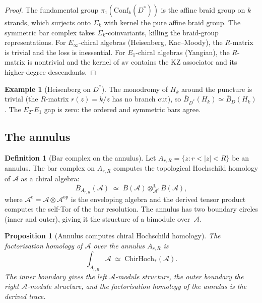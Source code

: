 \documentclass[11pt,reqno]{amsart}
\newtheorem{proposition}[theorem]{Proposition}
\theoremstyle{definition}
\newtheorem{definition}[theorem]{Definition}
\newtheorem{example}[theorem]{Example}
\theoremstyle{remark}
\providecommand{\cA}{\mathcal{A}}
\providecommand{\Conf}{\mathrm{Conf}}
\providecommand{\Eone}{E_1}
\providecommand{\Etwo}{E_2}
\providecommand{\Einf}{E_\infty}
\providecommand{\barB}{\bar{B}}
\providecommand{\ChirHoch}{\mathrm{ChirHoch}}
\begin{document}
\begin{proof}
The fundamental group $\pi_1(\Conf_k(D^*))$ is the affine
braid group on $k$ strands, which surjects onto $\Sigma_k$ with
kernel the pure affine braid group. The symmetric bar complex
takes $\Sigma_k$-coinvariants, killing the braid-group
representations. For $\Einf$-chiral algebras (Heisenberg,
Kac--Moody), the $R$-matrix is trivial and the loss is
inessential. For $\Eone$-chiral algebras (Yangian), the
$R$-matrix is nontrivial and the kernel of $\mathrm{av}$
contains the KZ associator and its higher-degree descendants.
\end{proof}

\begin{example}[Heisenberg on $D^*$]\label{ex:e-heis-punc}
The monodromy of $H_k$ around the puncture is trivial (the
$R$-matrix $r(z) = k/z$ has no branch cut), so
$\barB_{D^*}(H_k) \simeq \barB_D(H_k)$. The $\Etwo$-$\Eone$
gap is zero: the ordered and symmetric bars agree.
\end{example}

\subsection{The annulus}

\begin{definition}[Bar complex on the annulus]
\label{def:e-bar-annulus}
Let $A_{r,R} = \{z : r < |z| < R\}$ be an annulus. The bar
complex on $A_{r,R}$ computes the topological Hochschild homology of $\cA$
as a chiral algebra:
\begin{equation}\label{eq:e-bar-annulus}
\barB_{A_{r,R}}(\cA)
\;\simeq\;
\barB(\cA) \otimes^{\mathbf{L}}_{\cA^e} \barB(\cA),
\end{equation}
where $\cA^e = \cA \otimes \cA^{\mathrm{op}}$ is the
enveloping algebra and the derived tensor product computes
the self-Tor of the bar resolution. The annulus has two boundary
circles (inner and outer), giving it the structure of a bimodule
over~$\cA$.
\end{definition}

\begin{proposition}[Annulus computes chiral Hochschild homology]
\label{prop:e-annulus-hh}
The factorisation homology of $\cA$ over the annulus
$A_{r,R}$ is
\[
\int_{A_{r,R}} \cA
\;\simeq\;
\ChirHoch_*(\cA).
\]
The inner boundary gives the left $\cA$-module structure, the
outer boundary the right $\cA$-module structure, and the
factorisation homology of the annulus is the derived trace.
\end{proposition}
\end{document}
